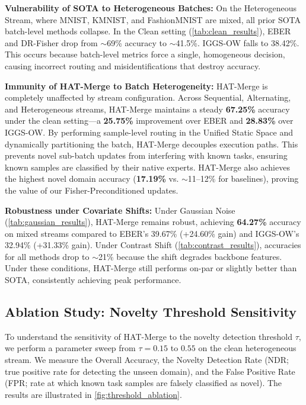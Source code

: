 \documentclass{article}
\theoremstyle{plain}
\theoremstyle{definition}
\theoremstyle{remark}
\begin{document}
\textbf{Vulnerability of SOTA to Heterogeneous Batches:} On the Heterogeneous Stream, where MNIST, KMNIST, and FashionMNIST are mixed, all prior SOTA batch-level methods collapse. In the Clean setting (\cref{tab:clean_results}), EBER and DR-Fisher drop from $\sim$69\% accuracy to $\sim$41.5\%. IGGS-OW falls to 38.42\%. This occurs because batch-level metrics force a single, homogeneous decision, causing incorrect routing and misidentifications that destroy accuracy.

\textbf{Immunity of HAT-Merge to Batch Heterogeneity:} HAT-Merge is completely unaffected by stream configuration. Across Sequential, Alternating, and Heterogeneous streams, HAT-Merge maintains a steady \textbf{67.25\%} accuracy under the clean setting—a \textbf{25.75\%} improvement over EBER and \textbf{28.83\%} over IGGS-OW. By performing sample-level routing in the Unified Static Space and dynamically partitioning the batch, HAT-Merge decouples execution paths. This prevents novel sub-batch updates from interfering with known tasks, ensuring known samples are classified by their native experts. HAT-Merge also achieves the highest novel domain accuracy (\textbf{17.19\%} vs. $\sim$11--12\% for baselines), proving the value of our Fisher-Preconditioned updates.

\textbf{Robustness under Covariate Shifts:} Under Gaussian Noise (\cref{tab:gaussian_results}), HAT-Merge remains robust, achieving \textbf{64.27\%} accuracy on mixed streams compared to EBER's 39.67\% (+24.60\% gain) and IGGS-OW's 32.94\% (+31.33\% gain). Under Contrast Shift (\cref{tab:contrast_results}), accuracies for all methods drop to $\sim$21\% because the shift degrades backbone features. Under these conditions, HAT-Merge still performs on-par or slightly better than SOTA, consistently achieving peak performance.

\subsection{Ablation Study: Novelty Threshold Sensitivity}
\label{submission_ablation_threshold}
To understand the sensitivity of HAT-Merge to the novelty detection threshold $\tau$, we perform a parameter sweep from $\tau = 0.15$ to $0.55$ on the clean heterogeneous stream. We measure the Overall Accuracy, the Novelty Detection Rate (NDR; true positive rate for detecting the unseen domain), and the False Positive Rate (FPR; rate at which known task samples are falsely classified as novel). The results are illustrated in \cref{fig:threshold_ablation}.
\end{document}
